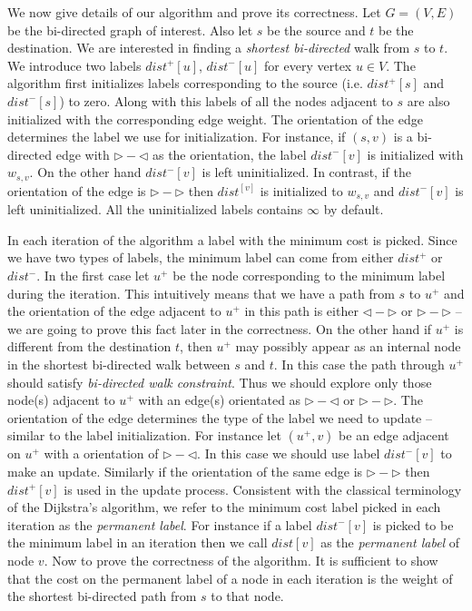 \documentclass[runningheads]{llncs}
\begin{document}
We now give details of our algorithm and prove its correctness. Let 
$G=(V,E)$ be the bi-directed graph of interest. Also let $s$ be the source 
and $t$ be the destination. We are interested in finding a {\em shortest 
bi-directed} walk from $s$ to $t$. We introduce two labels $dist^+[u]$, 
$dist^-[u]$ for every vertex $u \in V$. The algorithm first initializes
labels corresponding to the source (i.e. $dist^+[s]$ and $dist^-[s]$) 
to zero. Along with this labels of all the nodes adjacent to $s$ are
also initialized with the corresponding edge weight. The orientation
of the edge determines the label we use for initialization. For instance,
if $(s,v)$ is a bi-directed edge with $\rhd-\lhd$ as the orientation,
the label $dist^-[v]$ is initialized with $w_{s,v}$. On the 
other hand $dist^-[v]$ is left uninitialized. In contrast, if
the orientation of the edge is $\rhd-\rhd$ then $dist^[v]$ is initialized
to $w_{s,v}$ and $dist^-[v]$ is left uninitialized. All the uninitialized 
labels contains $\infty$ by default. 

In each iteration of the algorithm a label with the minimum cost is picked. 
Since we have two types of labels, the minimum label can come from either 
$dist^+$ or $dist^-$. In the first case let $u^+$ be the node corresponding
to the minimum label during the iteration. This intuitively means that we 
have a path from $s$ to $u^+$ and the orientation of the edge adjacent to 
$u^+$ in this path is either $\lhd-\rhd$ or $\rhd-\rhd$ -- we are going to 
prove this fact later in the correctness. On the other hand if $u^+$ is 
different from the destination $t$, then $u^+$ may possibly appear as an 
internal node in the shortest bi-directed walk between $s$ and $t$. In this 
case the path through $u^+$ should satisfy {\em bi-directed walk constraint}. 
Thus we should explore only those node(s) adjacent to $u^+$ with an edge(s) 
orientated as $\rhd-\lhd$ or $\rhd-\rhd$. The orientation 
of the edge determines the type of the label we need to update -- similar to 
the label initialization. For instance let $(u^+,v)$ be an edge adjacent on 
$u^+$ with a orientation of $\rhd-\lhd$. In this case we should use label 
$dist^-[v]$ to make an update. Similarly if the orientation of the same edge 
is $\rhd-\rhd$ then $dist^+[v]$ is used in the update process. Consistent
with the classical terminology of the Dijkstra's algorithm, we refer to the 
minimum cost label picked in each iteration as the {\em permanent label}.
For instance if a label $dist^-[v]$ is picked to be the minimum label in an
iteration then we call $dist[v]$ as the {\em permanent label} of node $v$.
Now to prove the correctness of the algorithm. It is sufficient to show that the
cost on the permanent label of a node in each iteration is the weight of the shortest
bi-directed path from $s$ to that node. 
\end{document}
